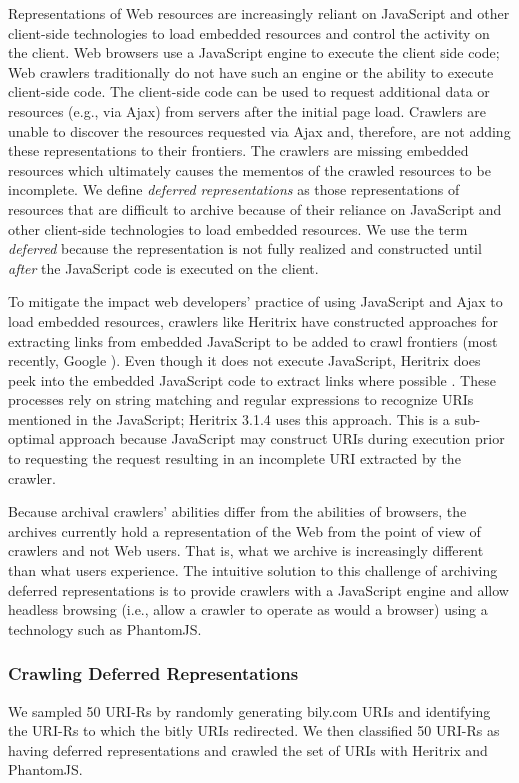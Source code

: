 Representations of Web resources are increasingly reliant on JavaScript and other client-side technologies to load embedded resources and control the activity on the client. Web browsers use a JavaScript engine to execute the client side code; Web crawlers traditionally do not have such an engine or the ability to execute client-side code. The client-side code can be used to request additional data or resources (e.g., via Ajax) from servers after the initial page load. Crawlers are unable to discover the resources requested via Ajax and, therefore, are not adding these representations to their frontiers. The crawlers are missing embedded resources which ultimately causes the mementos of the crawled resources to be incomplete. We define \emph{deferred representations} as those representations of resources that are difficult to archive because of their reliance on JavaScript and other client-side technologies to load embedded resources. We use the term \emph{deferred} because the representation is not fully realized and constructed until \emph{after} the JavaScript code is executed on the client. 

To mitigate the impact web developers' practice of using JavaScript and Ajax to load embedded resources, crawlers like Heritrix have constructed approaches for extracting links from embedded JavaScript to be added to crawl frontiers (most recently, Google \cite{googleJS}). Even though it does not execute JavaScript, Heritrix does peek into the embedded JavaScript code to extract links where possible \cite{htrixJS}. These processes rely on string matching and regular expressions to recognize URIs mentioned in the JavaScript; Heritrix 3.1.4 uses this approach. This is a sub-optimal approach because JavaScript may construct URIs during execution prior to requesting the request resulting in an incomplete URI extracted by the crawler.

Because archival crawlers' abilities differ from the abilities of browsers, the archives currently hold a representation of the Web from the point of view of crawlers and not Web users. That is, what we archive is increasingly different than what users experience. The intuitive solution to this challenge of archiving deferred representations is to provide crawlers with a JavaScript engine and allow headless browsing (i.e., allow a crawler to operate as would a browser) using a technology such as PhantomJS.

\subsubsection{Crawling Deferred Representations}
We sampled 50 URI-Rs by randomly generating bily.com URIs and identifying the URI-Rs to which the bitly URIs redirected. We then classified 50 URI-Rs as having deferred representations and crawled the set of URIs with Heritrix and PhantomJS. 

